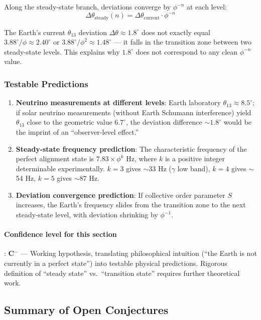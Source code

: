 Along the steady-state branch, deviations converge by $\phi^{-n}$ at each level:
\begin{equation}
\Delta\theta_{\text{steady}}(n) = \Delta\theta_{\text{current}} \cdot \phi^{-n}
\label{eq:deviation_convergence_en}
\end{equation}

The Earth's current $\theta_{13}$ deviation $\Delta\theta \approx 1.8^\circ$ does not exactly equal $3.88^\circ/\phi \approx 2.40^\circ$ or $3.88^\circ/\phi^2 \approx 1.48^\circ$ --- it falls in the transition zone between two steady-state levels. This explains why $1.8^\circ$ does not correspond to any clean $\phi^{-n}$ value.

\subsubsection{Testable Predictions}

\begin{enumerate}
\item \textbf{Neutrino measurements at different levels}: Earth laboratory $\theta_{13}\approx 8.5^\circ$; if solar neutrino measurements (without Earth Schumann interference) yield $\theta_{13}$ close to the geometric value $6.7^\circ$, the deviation difference $\sim 1.8^\circ$ would be the imprint of an ``observer-level effect.''
\item \textbf{Steady-state frequency prediction}: The characteristic frequency of the perfect alignment state is $7.83\times\phi^k$ Hz, where $k$ is a positive integer determinable experimentally. $k=3$ gives $\sim$33 Hz ($\gamma$ low band), $k=4$ gives $\sim$54 Hz, $k=5$ gives $\sim$87 Hz.
\item \textbf{Deviation convergence prediction}: If collective order parameter $S$ increases, the Earth's frequency slides from the transition zone to the next steady-state level, with deviation shrinking by $\phi^{-1}$.
\end{enumerate}

\paragraph{Confidence level for this section}: \textbf{C$^-$} --- Working hypothesis, translating philosophical intuition (``the Earth is not currently in a perfect state'') into testable physical predictions. Rigorous definition of ``steady state'' vs.\ ``transition state'' requires further theoretical work.

\subsection{Summary of Open Conjectures}
\label{subsec:conjectures}

